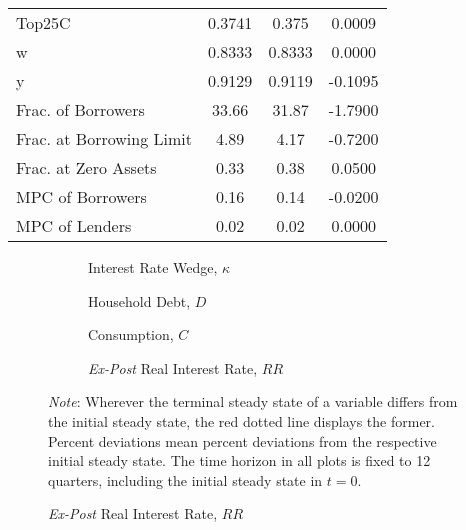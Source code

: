 \documentclass[12pt]{article} %
\numberwithin{equation}{section} %
\numberwithin{figure}{section}
\numberwithin{table}{section}
\begin{document}
\begin{table}[ht]
\begin{tabular}{lccc}
                  Top25C &  0.3741 &    0.375 &  0.0009 \\
                       w &  0.8333 &   0.8333 &  0.0000 \\
                       y &  0.9129 &   0.9119 & -0.1095 \\
      Frac. of Borrowers &   33.66 &    31.87 & -1.7900 \\
Frac. at Borrowing Limit &    4.89 &     4.17 & -0.7200 \\
    Frac. at Zero Assets &    0.33 &     0.38 &  0.0500 \\
        MPC of Borrowers &    0.16 &     0.14 & -0.0200 \\
          MPC of Lenders &    0.02 &     0.02 &  0.0000 \\
\hline
\end{tabular}
\end{table}

\begin{figure}[!ht]
    \centering
    \caption{Baseline Model -- Shock to the Interest Rate Wedge: Aggregate Dynamics}
    \label{fig:baseline-permanent-wedge-agg}
     \begin{subfigure}[b]{0.49\textwidth}
     \caption{Interest Rate Wedge, $\kappa$}
     \label{fig:baseline-permanent-wedge-agg-phi}
         \centering
         
     \end{subfigure}
    \hfill
    \begin{subfigure}[b]{0.49\textwidth}
    \caption{Household Debt, $D$}
         \centering
         
     \end{subfigure}
     \hfill
    \begin{subfigure}[b]{0.49\textwidth}
    \caption{Consumption, $C$}
         \centering
         
     \end{subfigure}
     \hfill
     \begin{subfigure}[b]{0.49\textwidth}
     \caption{\textit{Ex-Post} Real Interest Rate, $RR$}
         \centering
         
     \end{subfigure}
     \justifying
     \footnotesize
	\textit{Note}: Wherever the terminal steady state of a variable differs from the initial steady state, the red dotted line displays the former. Percent deviations mean percent deviations from the respective initial steady state. The time horizon in all plots is fixed to 12 quarters, including the initial steady state in $t=0$.
\end{figure}
\end{document}
